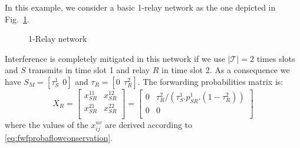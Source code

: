 \documentclass[a4paper]{article}
\newcommand{\T}{\mathcal{T}}
\newcommand{\Smatrix}{S_M}
\begin{document}
{In this example, we consider a basic 1-relay network as the one depicted in Fig.~\ref{fig:1relay}.
\begin{figure}
\begin{center}
   \caption{1-Relay network}
\label{fig:1relay}
\end{center}
\end{figure}
Interference is completely mitigated in this network if we use $|\T|=2$ times slots and $S$ transmits in time slot 1 and relay $R$ in time slot 2. As a consequence we have $\Smatrix=\left[\tau_S^1~~ 0 \right]$ and $\tau_R = \left[0 ~~ \tau_R^2 \right]$. The forwarding probabilities matrix is:
\[X_R = \left[ 
\begin{array}{cc}
	x_{SR}^{11} & x_{SR}^{12} \\ 
	x_{SR}^{21} & x_{SR}^{22} \\
\end{array}
\right] = 
\left[ 
\begin{array}{cc}
	0 & \tau_R^2 / (\tau_S^1.p_{SR}^1.(1-\tau_R^2)) \\ 
	0 & 0 \\
\end{array}
\right] 
\]  
where the values of the $x_{ij}^{uv}$ are derived according to \eqref{eq:fwfprobaflowconservation}. 
}
\end{document}
